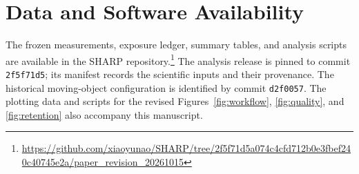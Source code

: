 \section*{Data and Software Availability}

The frozen measurements, exposure ledger, summary tables, and analysis
scripts are available in the SHARP repository.\footnote{\url{https://github.com/xiaoyunao/SHARP/tree/2f5f71d5a074c4cfd712b0e3fbef240c40745e2a/paper_revision_20261015}}
The analysis release is pinned to commit \texttt{2f5f71d5}; its
manifest records the scientific inputs and their provenance. The
historical moving-object configuration is identified by commit
\texttt{d2f0057}. The plotting data and scripts for the revised
Figures~\ref{fig:workflow}, \ref{fig:quality}, and \ref{fig:retention}
also accompany this manuscript.


